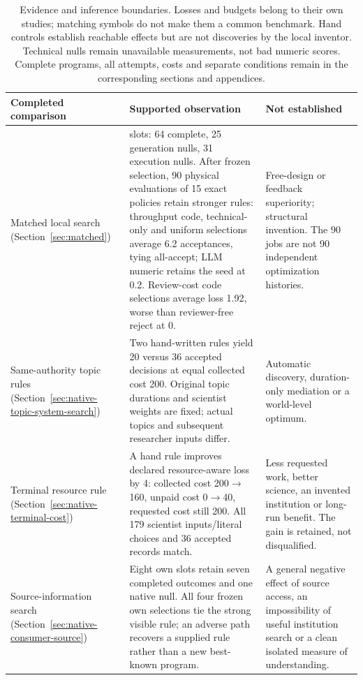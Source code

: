 \begin{table}[t]
\centering\small
\setlength{\tabcolsep}{3pt}
\begin{tabular}{@{}>{\raggedright\arraybackslash}p{.20\linewidth}>{\raggedright\arraybackslash}p{.41\linewidth}>{\raggedright\arraybackslash}p{.33\linewidth}@{}}
\toprule
Completed comparison & Supported observation & Not established \\
\midrule
Matched local search (Section~\ref{sec:matched}) &
120 slots: 64 complete, 25 generation nulls, 31 execution nulls. After frozen
selection, 90 physical evaluations of 15 exact policies retain stronger rules:
throughput code, technical-only and uniform selections average 6.2 acceptances,
tying all-accept; LLM numeric retains the seed at 0.2. Review-cost code selections
average loss 1.92, worse than reviewer-free reject at 0. &
Free-design or feedback superiority; structural invention. The 90 jobs are
not 90 independent optimization histories. \\
\addlinespace
Same-authority topic rules (Section~\ref{sec:native-topic-system-search}) &
Two hand-written rules yield 20 versus 36 accepted decisions at equal
collected cost 200. Original topic durations and scientist weights are fixed;
actual topics and subsequent researcher inputs differ. &
Automatic discovery, duration-only mediation or a world-level optimum. \\
\addlinespace
Terminal resource rule (Section~\ref{sec:native-terminal-cost}) &
A hand rule improves declared resource-aware loss by 4: collected cost
200$\to$160, unpaid cost 0$\to$40, requested cost still 200. All 179 scientist
inputs/literal choices and 36 accepted records match. &
Less requested work, better science, an invented institution or long-run benefit.
The gain is retained, not disqualified. \\
\addlinespace
Source-information search (Section~\ref{sec:native-consumer-source}) &
Eight own slots retain seven completed outcomes and one native null. All four
frozen own selections tie the strong visible rule; an adverse path recovers a
supplied rule rather than a new best-known program. &
A general negative effect of source access, an impossibility of useful
institution search or a clean isolated measure of understanding. \\
\bottomrule
\end{tabular}
\caption{Evidence and inference boundaries. Losses and budgets belong to their
own studies; matching symbols do not make them a common benchmark. Hand
controls establish reachable effects but are not discoveries by the local
inventor. Technical nulls remain unavailable measurements, not bad numeric
scores. Complete programs, all attempts, costs and separate conditions remain
in the corresponding sections and appendices.}
\label{tab:claim-evidence-map}
\end{table}

